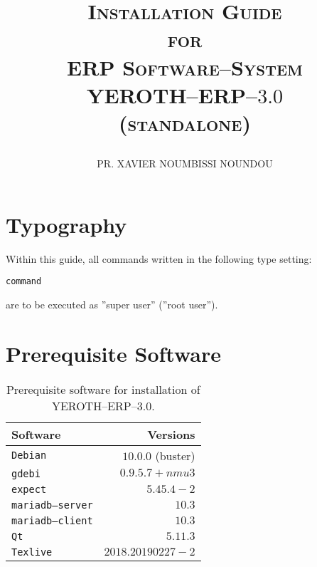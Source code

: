 \documentclass[a4paper, 10pt]{article}
\newcommand{\texlive}{\texttt{Texlive}\xspace}
\newcommand{\gdebi}{\texttt{gdebi}\xspace}
\newcommand{\expect}{\texttt{expect}\xspace}
\newcommand{\debian}{\texttt{Debian}\xspace}
\newcommand{\qt}{\texttt{Qt}\xspace}
\newcommand{\mariadbserver}{\texttt{mariadb--server}\xspace}
\newcommand{\mariadbclient}{\texttt{mariadb--client}\xspace}
\newcommand{\yerotherptroiszero}{\textcolor{yerothColorBlue}{\sc YEROTH--ERP--$3.0$}\xspace}
\newcommand{\yerotherp}{\textcolor{yerothColorBlue}{\sc YEROTH--ERP--$3.0$}\xspace}
\newcommand{\erp}{ERP Software--System\xspace}
\newcommand{\myfullacademicname}{PR. XAVIER NOUMBISSI NOUNDOU\xspace}
\newcommand{\rootcommand}[1]{
\begin{center}
\textcolor{purplish}{#1\xspace}
\end{center}}
\begin{document}

\title{
\vspace{-1.65em}
\textcolor{medgreen}{\textsc{Installation Guide\\
										for \\
									 \erp \\ \vspace{1em}
									 \yerotherp \\ 
									 \hspace{0.6em} \textcolor{yerothColorBlue}{(standalone)} }}
									 \author{\myfullacademicname}
}

\date{} 
\maketitle
\thispagestyle{fancy}

\vspace{-0.5em}

{}
\begingroup
\tableofcontents
\endgroup

\vspace{0.25cm}

\section{Typography}

Within this guide, all commands written
in the following type setting:
	\begin{alltt}
		\rootcommand{command}
	\end{alltt}
are to be executed as ''super user'' (''root user'').

\section{Prerequisite Software}

\begin{table}[!htbp]
\centering
\begin{tabular}{l|r}
\textbf{Software}	&
\textbf{Versions}	\\ \hline
\debian				&
$10.0.0$ (buster)	\\ \hline
\gdebi				&
$0.9.5.7+nmu3$		\\ \hline
\expect				&
$5.45.4-2$			\\ \hline
\mariadbserver		&
$10.3$				\\ \hline
\mariadbclient		&
$10.3$				\\ \hline
\qt					&
$5.11.3$			\\ \hline	
\texlive			&
$2018.20190227-2$	\\
\end{tabular}
\caption{Prerequisite software for installation of \yerotherptroiszero.}
\label{tab:prerequisite-software}
\end{table}
\end{document}
